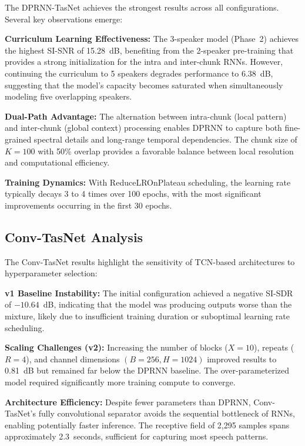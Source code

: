 \documentclass[conference]{IEEEtran}
\begin{document}
The DPRNN-TasNet achieves the strongest results across all configurations. Several key observations emerge:

\textbf{Curriculum Learning Effectiveness:} The 3-speaker model (Phase~2) achieves the highest SI-SNR of 15.28~dB, benefiting from the 2-speaker pre-training that provides a strong initialization for the intra and inter-chunk RNNs. However, continuing the curriculum to 5 speakers degrades performance to 6.38~dB, suggesting that the model's capacity becomes saturated when simultaneously modeling five overlapping speakers.

\textbf{Dual-Path Advantage:} The alternation between intra-chunk (local pattern) and inter-chunk (global context) processing enables DPRNN to capture both fine-grained spectral details and long-range temporal dependencies. The chunk size of $K = 100$ with 50\% overlap provides a favorable balance between local resolution and computational efficiency.

\textbf{Training Dynamics:} With ReduceLROnPlateau scheduling, the learning rate typically decays 3 to 4 times over 100 epochs, with the most significant improvements occurring in the first 30 epochs.

\subsection{Conv-TasNet Analysis}

The Conv-TasNet results highlight the sensitivity of TCN-based architectures to hyperparameter selection:

\textbf{v1 Baseline Instability:} The initial configuration achieved a negative SI-SDR of $-10.64$~dB, indicating that the model was producing outputs worse than the mixture, likely due to insufficient training duration or suboptimal learning rate scheduling.

\textbf{Scaling Challenges (v2):} Increasing the number of blocks ($X = 10$), repeats ($R = 4$), and channel dimensions $(B = 256, H = 1024)$ improved results to 0.81~dB but remained far below the DPRNN baseline. The over-parameterized model required significantly more training compute to converge.

\textbf{Architecture Efficiency:} Despite fewer parameters than DPRNN, Conv-TasNet's fully convolutional separator avoids the sequential bottleneck of RNNs, enabling potentially faster inference. The receptive field of 2,295 samples spans approximately 2.3~seconds, sufficient for capturing most speech patterns.
\end{document}
